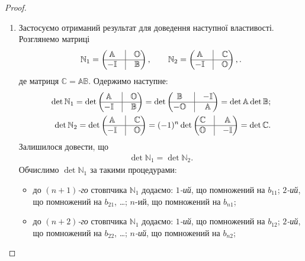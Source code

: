 \documentclass{math_library}
\begin{document}
\begin{proof}
\begin{enumerate}[topsep=0pt,wide=0pt,label={\arabic*)}]
\item Застосуємо отриманий результат для доведення наступної властивості. Розглянемо матриці
\begin{align*}
\mathbb{N}_1 = \begin{pmatrix}
 \mathbb{A} & \vline & \mathbb{O} \\
 \hline
 -\mathbb{I} & \vline & \mathbb{B}
\end{pmatrix}, \qquad \mathbb{N}_2 = \begin{pmatrix}
 \mathbb{A} & \vline & \mathbb{C} \\
 \hline
 -\mathbb{I} & \vline & \mathbb{O}
\end{pmatrix},.
\end{align*}
де матриця $\mathbb{C} = \mathbb{A} \mathbb{B}$. Одержимо наступне:
\begin{align*}
\det \mathbb{N}_1 = \det \begin{pmatrix}
 \mathbb{A} & \vline & \mathbb{O} \\
 \hline
 -\mathbb{I} & \vline & \mathbb{B}
\end{pmatrix} = \det \begin{pmatrix}
 \mathbb{B} & \vline & -\mathbb{I} \\
 \hline
 -\mathbb{O} & \vline & \mathbb{A}
\end{pmatrix} = \det \mathbb{A} \det \mathbb{B}; \\
\det \mathbb{N}_2 = \det \begin{pmatrix}
 \mathbb{A} & \vline & \mathbb{C} \\
 \hline
 -\mathbb{I} & \vline & \mathbb{O}
\end{pmatrix} = (-1)^n \det \begin{pmatrix}
 \mathbb{C} & \vline & \mathbb{A} \\
 \hline
 \mathbb{O} & \vline & -\mathbb{I}
\end{pmatrix} = \det \mathbb{C}.
\end{align*}
Залишилося довести, що
\begin{align*}
\det \mathbb{N}_1 = \det \mathbb{N}_2.
\end{align*}
Обчислимо $\det \mathbb{N}_1$ за такими процедурами:
\begin{itemize}[nosep,wide=0pt,label={--}]
\item до $(n+1)$\textit{-го} стовпчика $\mathbb{N}_1$ додаємо: $1$\textit{-ий}, що помножений на $b_{11}$; $2$\textit{-ий}, що помножений на $b_{21}$, \dots ; $n$-ий, що помножений на $b_{n1}$;
\item до $(n+2)$\textit{-го} стовпчика $\mathbb{N}_1$ додаємо: $1$\textit{-ий}, що помножений на $b_{12}$; $2$\textit{-ий}, що помножений на $b_{22}$, \dots ; $n$\textit{-ий}, що помножений на $b_{n2}$;\\

\end{itemize}
\end{enumerate}
\end{proof}
\end{document}
